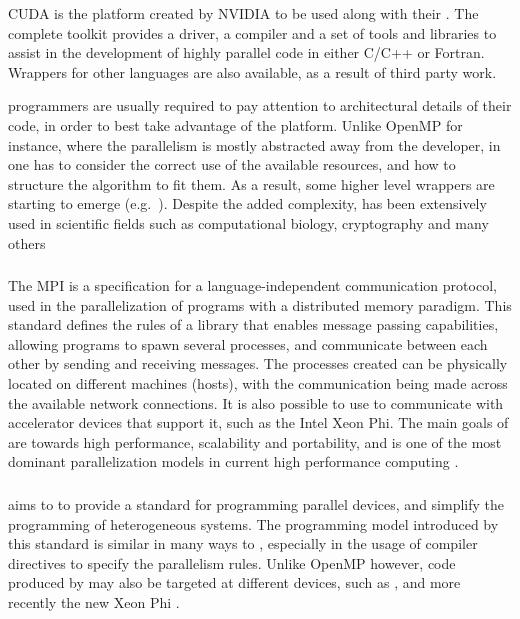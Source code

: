 \documentclass[main.tex]{subfiles}
\begin{document}
CUDA is the platform created by NVIDIA to be used along with their \gpus. The complete \cuda toolkit provides a driver, a compiler and a set of tools and libraries to assist in the development of highly parallel \gpu code in either C/C++ or Fortran. Wrappers for other languages are also available, as a result of third party work.

\cuda programmers are usually required to pay attention to architectural details of their code, in order to best take advantage of the platform. Unlike OpenMP for instance, where the parallelism is mostly abstracted away from the developer, in \cuda one has to consider the correct use of the available resources, and how to structure the algorithm to fit them. As a result, some higher level wrappers are starting to emerge (e.g.\ \openacc). Despite the added complexity, \cuda has been extensively used in scientific fields such as computational biology, cryptography and many others \cite{manavski2008cuda,vasiliadis2008gnort,manavski2007cuda}



\subsubsection{\mpi}

The \acf{MPI} is a specification for a language-independent communication protocol, used in the parallelization of programs with a distributed memory paradigm. This standard defines the rules of a library that enables message passing capabilities, allowing programs to spawn several processes, and communicate between each other by sending and receiving messages. The processes created can be physically located on different machines (hosts), with the communication being made across the available network connections. It is also possible to use \mpi to communicate with accelerator devices that support it, such as the Intel Xeon Phi. The main goals of \mpi are towards high performance, scalability and portability, and is one of the most dominant parallelization models in current high performance computing \cite{sur2006high}.


\subsubsection{\openacc}
\openacc aims to to provide a standard for programming parallel devices, and simplify the programming of heterogeneous systems.
The programming model introduced by this standard is similar in many ways to \openmp, especially in the usage of compiler directives to specify the parallelism rules. Unlike \acs{OpenMP} however, code produced by \openacc may also be targeted at different devices, such as \gpus, and more recently the new \intel Xeon Phi \cite{openacc-phi2012}.
\end{document}

